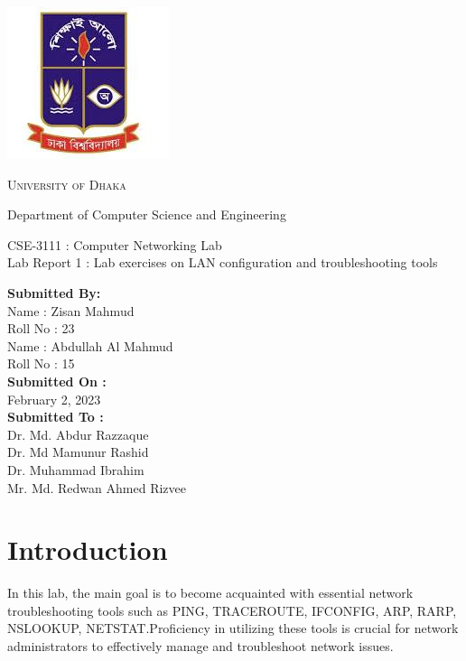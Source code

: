 \documentclass[11pt]{report}
\begin{document}
\begin{titlepage}
    \begin{center}
        \includegraphics[scale=0.50]{du.jpeg}\par
        \begin{Huge}
            \textsc{University of Dhaka}\par
        \end{Huge}
        \begin{Large}
            Department of Computer Science and Engineering\par \vspace{1cm}
            CSE-3111 : Computer Networking Lab \\[12pt]
            Lab Report 1 : Lab exercises on LAN configuration and troubleshooting tools
        \end{Large}
    \end{center}
    \begin{center}
        \textbf{Submitted By:\\[12pt]}
        Name : Zisan Mahmud\\[8pt]
        Roll No : 23\\[12pt]
        Name :  Abdullah Al Mahmud\\[8pt]
        Roll No : 15\\[12pt]
        \textbf{Submitted On : \\[12pt]}
        February 2, 2023\\[20pt]
        \textbf{Submitted To :\\[12pt]}
        Dr. Md. Abdur Razzaque\\[12pt]
        Dr. Md Mamunur Rashid\\[12pt]
        Dr. Muhammad Ibrahim\\[12pt]
        Mr. Md. Redwan Ahmed Rizvee\\[12pt]
    \end{center}
\end{titlepage}

\section{Introduction}
In this lab, the main goal is to become acquainted with essential network troubleshooting tools 
such as PING, TRACEROUTE, IFCONFIG, ARP, RARP, NSLOOKUP, NETSTAT.Proficiency in utilizing these tools is crucial for network administrators to effectively manage and troubleshoot network issues.
\end{document}
